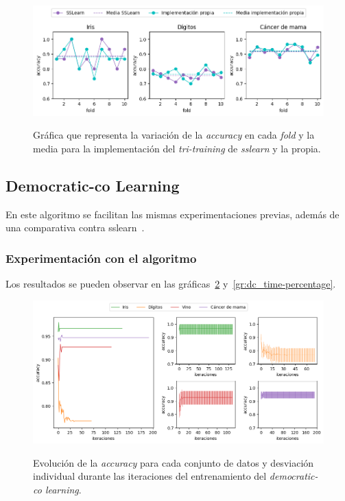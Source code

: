 \begin{figure}[h]
	\caption[\textit{Tri-training}: comparativa contra \textit{sslearn}]{Gráfica que representa la variación de la \textit{accuracy} en cada \textit{fold} y la media para la implementación del \textit{tri-training} de \textit{sslearn} y la propia.}
	\centering
	\includegraphics[scale=0.62]{../img/memoria/5_tritraining_sslearn}
	\label{gr:tt_vs_sslearn}
\end{figure}


\subsection{Democratic-co Learning}

En este algoritmo se facilitan las mismas experimentaciones previas, además de una comparativa contra sslearn~\cite{sslearnRepo}.

\subsubsection{Experimentación con el algoritmo}
Los resultados se pueden observar en las gráficas~\ref{gr:dc_train-iterations} y~\ref{gr:dc_time-percentage}.

\begin{figure}[h]
	\caption[\textit{Democratic-co}: resultados experimentación (iteraciones-entrenamiento)]{Evolución de la \textit{accuracy} para cada conjunto de datos y desviación individual durante las iteraciones del entrenamiento del \textit{democratic-co learning}.}
	\centering
	\includegraphics[scale=0.5]{../img/memoria/5_democraticco_score-iteraciones}
	\label{gr:dc_train-iterations}
\end{figure}


